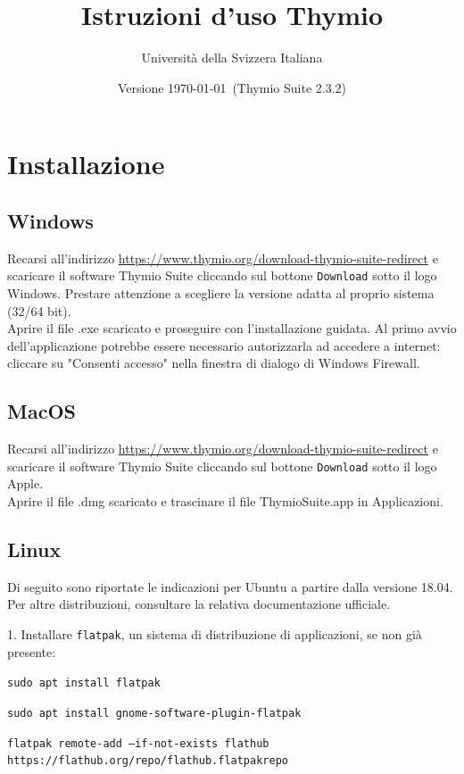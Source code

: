 \documentclass[12pt]{article}
\title{Istruzioni d'uso Thymio}
\author{Università della Svizzera Italiana}
\date{Versione \today \ (Thymio Suite 2.3.2)}
\begin{document}
\maketitle
\tableofcontents
\newpage


\section{Installazione}\label{installation}

\subsection{Windows}

Recarsi all'indirizzo \url{https://www.thymio.org/download-thymio-suite-redirect} e scaricare il software Thymio Suite cliccando sul bottone \texttt{Download} sotto il logo Windows. Prestare attenzione a scegliere la versione adatta al proprio sistema (32/64 bit).\\
Aprire il file .exe scaricato e proseguire con l'installazione guidata. Al primo avvio dell'applicazione potrebbe essere necessario autorizzarla ad accedere a internet: cliccare su "Consenti accesso" nella finestra di dialogo di Windows Firewall.

\subsection{MacOS}

Recarsi all'indirizzo \url{https://www.thymio.org/download-thymio-suite-redirect} e scaricare il software Thymio Suite cliccando sul bottone \texttt{Download} sotto il logo Apple.\\
Aprire il file .dmg scaricato e trascinare il file ThymioSuite.app in Applicazioni.

\subsection{Linux}

Di seguito sono riportate le indicazioni per Ubuntu a partire dalla versione 18.04. Per altre distribuzioni, consultare la relativa documentazione ufficiale.

1. Installare \texttt{flatpak}, un sistema di distribuzione di applicazioni, se non già presente:

\texttt{sudo apt install flatpak}

\texttt{sudo apt install gnome-software-plugin-flatpak}

\texttt{flatpak remote-add --if-not-exists flathub https://flathub.org/repo/flathub.flatpakrepo}
\end{document}
